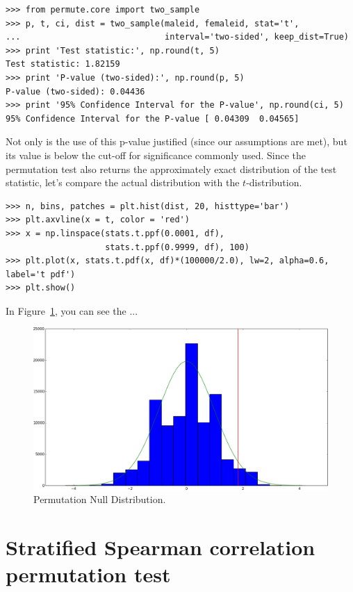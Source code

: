 \begin{verbatim}
>>> from permute.core import two_sample
>>> p, t, ci, dist = two_sample(maleid, femaleid, stat='t',
...                             interval='two-sided', keep_dist=True)
>>> print 'Test statistic:', np.round(t, 5)
Test statistic: 1.82159
>>> print 'P-value (two-sided):', np.round(p, 5)
P-value (two-sided): 0.04436
>>> print '95% Confidence Interval for the P-value', np.round(ci, 5)
95% Confidence Interval for the P-value [ 0.04309  0.04565]
\end{verbatim}

Not only is the use of this p-value justified (since our assumptions are
met), but its value is below the cut-off for significance commonly used.
Since the permutation test also returns the approximately exact distribution
of the test statistic, let's compare the actual distribution with the
$t$-distribution.

\begin{verbatim}
>>> n, bins, patches = plt.hist(dist, 20, histtype='bar')
>>> plt.axvline(x = t, color = 'red')
>>> x = np.linspace(stats.t.ppf(0.0001, df),
                    stats.t.ppf(0.9999, df), 100)
>>> plt.plot(x, stats.t.pdf(x, df)*(100000/2.0), lw=2, alpha=0.6, label='t pdf')
>>> plt.show()
\end{verbatim}

In Figure~\ref{fig:figure1}, you can see the ...

\begin{figure}
  \begin{centering}
    \includegraphics[width=.8\textwidth]{fig/figure_1.png}\par
  \end{centering}

  \caption{\label{fig:figure1}Permutation Null Distribution.}

\end{figure}

\section*{Stratified Spearman correlation permutation test}


